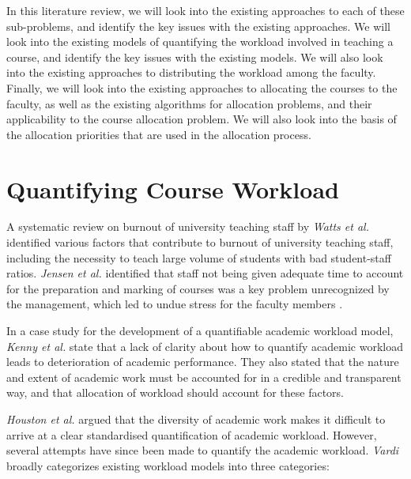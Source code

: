 In this literature review, we will look into the existing approaches to each of these sub-problems, and identify the key issues with the existing approaches. We will look into the existing models of quantifying the workload involved in teaching a course, and identify the key issues with the existing models. We will also look into the existing approaches to distributing the workload among the faculty. Finally, we will look into the existing approaches to allocating the courses to the faculty, as well as the existing algorithms for allocation problems, and their applicability to the course allocation problem. We will also look into the basis of the allocation priorities that are used in the allocation process.

\section{Quantifying Course Workload}

A systematic review on burnout of university teaching staff by \textit{Watts et al.} \cite{watts2011burnout} identified various factors that contribute to burnout of university teaching staff, including the necessity to teach large volume of students with bad student-staff ratios. \textit{Jensen et al.} identified that staff not being given adequate time to account for the preparation and marking of courses was a key problem unrecognized by the management, which led to undue stress for the faculty members \cite{jensen2009vanishing}.

In a case study for the development of a quantifiable academic workload model, \textit{Kenny et al.} state that a lack of clarity about how to quantify academic workload leads to deterioration of academic performance\cite{kenny2012placing}. They also stated that the nature and extent of academic work must be accounted for in a credible and transparent way, and that allocation of workload should account for these factors.

\textit{Houston et al.} \cite{houston2006academic} argued that the diversity of academic work makes it difficult to arrive at a clear standardised quantification of academic workload. However, several attempts have since been made to quantify the academic workload. \textit{Vardi} \cite{vardi2009impacts} broadly categorizes existing workload models into three categories:


